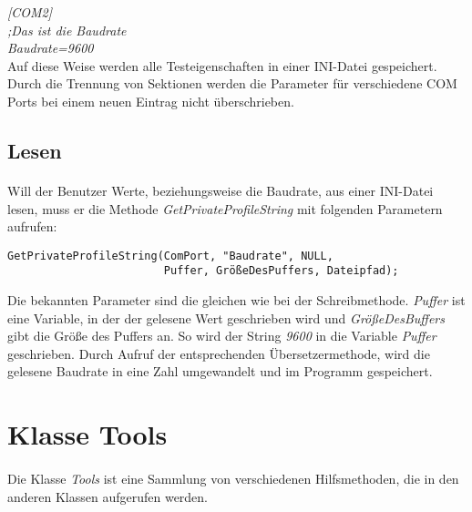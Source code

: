 \hspace*{20mm}\textit{[COM2]}    \\
\hspace*{20mm}\textit{;Das ist die Baudrate}    \\
\hspace*{20mm}\textit{Baudrate=9600}\\

Auf diese Weise werden alle Testeigenschaften in einer INI-Datei gespeichert. Durch die Trennung von Sektionen werden die Parameter für verschiedene COM Ports bei einem neuen Eintrag nicht überschrieben.


\subsection{Lesen}
\paragraph{}
Will der Benutzer Werte, beziehungsweise die Baudrate, aus einer INI-Datei lesen, muss er die Methode \textit{GetPrivateProfileString} mit folgenden Parametern aufrufen:\\

\begin{lstlisting}
GetPrivateProfileString(ComPort, "Baudrate", NULL,
                        Puffer, GrößeDesPuffers, Dateipfad);
\end{lstlisting}

Die bekannten Parameter sind die gleichen wie bei der Schreibmethode. \textit{Puffer} ist eine Variable, in der der gelesene Wert geschrieben wird und \textit{GrößeDesBuffers} gibt die Größe des Puffers an. So wird der String \textit{9600} in die Variable \textit{Puffer} geschrieben. Durch Aufruf der entsprechenden Übersetzermethode, wird die gelesene Baudrate in eine Zahl umgewandelt und im Programm gespeichert.


\newpage

\section{Klasse Tools}
\paragraph{}
Die Klasse \textit{Tools} ist eine Sammlung von verschiedenen Hilfsmethoden, die in den anderen Klassen aufgerufen werden.

